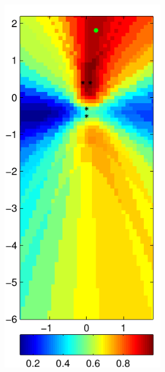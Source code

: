 \documentclass[spanish,openright]{book}
\begin{document}
\begin{figure}
\begin{subfigure}[t]{0.47\textwidth}
\begin{minipage}[t]{\textwidth}
\begin{subfigure}[t]{0.3\textwidth}
\label{fig:SRP_pos08}
      \end{subfigure}
\begin{subfigure}[t]{0.3\textwidth}
        \includegraphics[width=\textwidth]{SRP_Fo1500_mean_pos08}

\end{subfigure}
\end{minipage}
\end{subfigure}
\end{figure}
\end{document}

